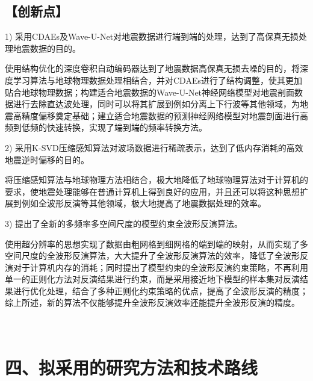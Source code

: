 \documentclass[11pt]{article}
\newcommand{\hei}{\CJKfamily{hei}}
\newcommand{\kai}{\CJKfamily{kai}}
\begin{document}
\subsection*{\kai\fontsize{11pt}{10pt} \selectfont【创新点】}
1) 采用CDAEs及Wave-U-Net对地震数据进行端到端的处理，达到了高保真无损处理地震数据的目的。
\par
使用结构优化的深度卷积自动编码器达到了地震数据高保真无损去噪的目的，将深度学习算法与地球物理数据处理相结合，并对CDAEs进行了结构调整，使其更加贴合地球物理数据；构建适合地震数据的Wave-U-Net神经网络模型对地震剖面数据进行去除直达波处理，同时可以将其扩展到例如分离上下行波等其他领域，为地震高精度偏移奠定基础；建立适合地震数据的预测神经网络模型对地震剖面进行高频到低频的快速转换，实现了端到端的频率转换方法。
\par
2) 采用K-SVD压缩感知算法对波场数据进行稀疏表示，达到了低内存消耗的高效地震逆时偏移的目的。
\par
将压缩感知算法与地球物理方法相结合，极大地降低了地球物理算法对于计算机的要求，使地震处理能够在普通计算机上得到良好的应用，并且还可以将这种思想扩展到例如全波形反演等其他领域，极大地提高了地震数据处理的效率。
\par
3) 提出了全新的多频率多空间尺度的模型约束全波形反演算法。
\par
使用超分辨率的思想实现了数据由粗网格到细网格的端到端的映射，从而实现了多空间尺度的全波形反演算法，大大提升了全波形反演算法的效率，降低了全波形反演对于计算机内存的消耗；同时提出了模型约束的全波形反演约束策略，不再利用单一的正则化方法对反演结果进行约束，而是采用接近地下模型的样本集对反演结果进行优化处理，结合了多种正则化约束策略的优点，提高了全波形反演的精度；综上所述，新的算法不仅能够提升全波形反演效率还能提升全波形反演的精度。
\par
\newpage
\section*{\hei\fontsize{11pt}{10pt} \selectfont \\ 四、拟采用的研究方法和技术路线}
\end{document}
